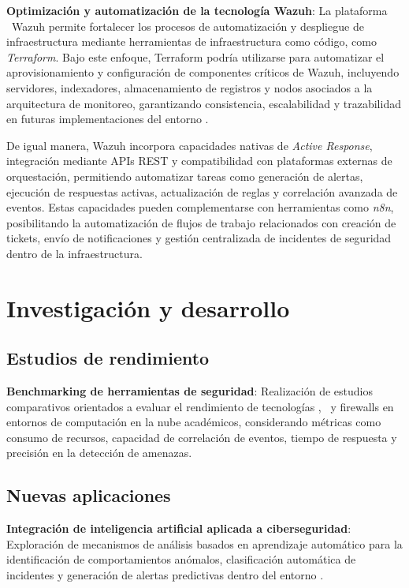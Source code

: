 \textbf{Optimización y automatización de la tecnología Wazuh}:  
La plataforma \SIEM\ Wazuh permite fortalecer los procesos de automatización y despliegue de infraestructura mediante herramientas de 
infraestructura como código, como \textit{Terraform}. Bajo este enfoque, Terraform podría utilizarse para automatizar el aprovisionamiento 
y configuración de componentes críticos de Wazuh, incluyendo servidores, indexadores, almacenamiento de registros y nodos asociados a la 
arquitectura de monitoreo, garantizando consistencia, escalabilidad y trazabilidad en futuras implementaciones del entorno \GRID.

De igual manera, Wazuh incorpora capacidades nativas de \textit{Active Response}, integración mediante APIs REST y compatibilidad con 
plataformas externas de orquestación, permitiendo automatizar tareas como generación de alertas, ejecución de respuestas activas, 
actualización de reglas y correlación avanzada de eventos. Estas capacidades pueden complementarse con herramientas como \textit{n8n}, 
posibilitando la automatización de flujos de trabajo relacionados con creación de tickets, envío de notificaciones y gestión centralizada 
de incidentes de seguridad dentro de la infraestructura.

\section{Investigación y desarrollo}
\noindent

\subsection{Estudios de rendimiento}
\noindent

\textbf{Benchmarking de herramientas de seguridad}:  
Realización de estudios comparativos orientados a evaluar el rendimiento de tecnologías \SIEM, \IDPS\ y firewalls en entornos de computación 
en la nube académicos, considerando métricas como consumo de recursos, capacidad de correlación de eventos, tiempo de respuesta y precisión 
en la detección de amenazas.

\subsection{Nuevas aplicaciones}
\noindent

\textbf{Integración de inteligencia artificial aplicada a ciberseguridad}:  
Exploración de mecanismos de análisis basados en aprendizaje automático para la identificación de comportamientos anómalos, clasificación 
automática de incidentes y generación de alertas predictivas dentro del entorno \GRID.

